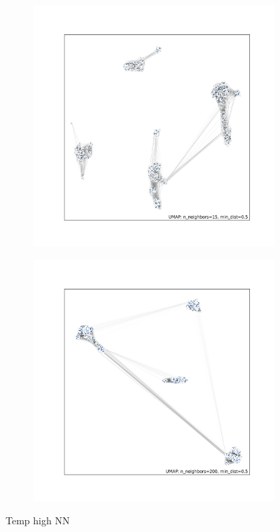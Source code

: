 \documentclass[12pt]{article}
\begin{document}
\begin{figure}[h!]
\begin{subfigure}[b]{0.49\linewidth}
    \caption{}
    \label{fig:UMAP_high_NN_1KGP}
  \end{subfigure}
  \begin{subfigure}[b]{0.49\linewidth}
    \includegraphics[width=\linewidth]{code/images/UMAP_connectivity_low_NN.png}
    \caption{}
    \label{fig:UMAP_low_NN_connectivity}
  \end{subfigure}
  \begin{subfigure}[b]{0.49\linewidth}
    \includegraphics[width=\linewidth]{code/images/UMAP_connectivity_high_NN.png}
    \caption{}
    \label{fig:UMAP_high_NN_connectivity}
  \end{subfigure}
  \caption{Temp high NN }
  \label{fig:UMAP_connectivity}
\end{figure}
\end{document}
